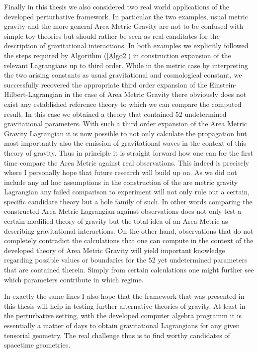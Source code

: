 \documentclass[a4paper,12pt, DIV=14, BCOR=5mm, twoside, headsepline, numbers=noenddot]{scrbook}
\begin{document}
Finally in this thesis we also considered two real world applications of the developed perturbative framework. In particular the two examples, usual metric gravity and the more general Area Metric Gravity are not to be confused with simple toy theories but should rather be seen as real canditates for the description of gravitational interactions. In both examples we explicitly followed the steps required by Algorithm (\ref{Algo2}) in construction expansion of the relevant Lagrangians up to third order. While in the metric case by interpreting the two arising constants as usual gravitational and cosmological constant, we successfully recovered the appropriate third order expansion of the Einstein-Hilbert-Lagrangian in the case of Area Metric Gravity there obviously does not exist any established reference theory to which we can compare the computed result. In this case we obtained a theory that contained $52$ undetermined gravitational parameters. 
With such a third order expansion of the Area Metric Gravity Lagrangian it is now possible to not only calculate the propagation but most importantly also the emission of gravitational waves in the context of this theory of gravity. Thus in principle it is straight forward how one can for the first time compare the Area Metric against real observations. This indeed is precisely where I personally hope that future research will build up on. 
As we did not include any ad hoc assumptions in the construction of the are metric gravity Lagrangian any failed comparison to experiment will not only rule out a certain, specific candidate theory but a hole family of such. In other words comparing the constructed Area Metric Lagrangian against observations does not only test a certain modified theory of gravity but the total idea of an Area Metric as describing gravitational interactions. 
On the other hand, observations that do not completely contradict the calculations that one can compute in the context of the developed theory of Area Metric Gravity will yield important knowledge regarding possible values or boundaries for the $52$ yet undetermined parameters that are contained therein. 
Simply from certain calculations one might further see which parameters contribute in which regime. 

In exactly the same lines I also hope that the framework that was presented in this thesis will help in testing further alternative theories of gravity. At least in the perturbative setting, with the developed computer algebra programm it is essentially a matter of days to obtain gravitational Lagrangians for any given tensorial geometry. The real challenge thus is to find worthy candidates of spacetime geometries. 
\end{document}
